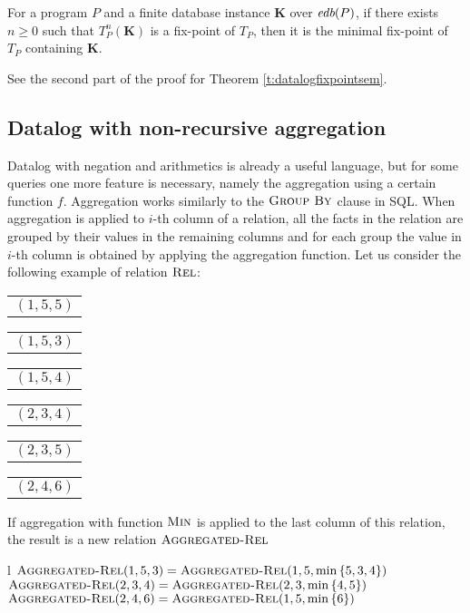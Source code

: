 \begin{thm}
For a program $P$ and a finite database instance $\textbf{K}$ over $\textit{edb}(P)$, if there exists $n \ge 0$ such that $T_P^n(\textbf{K})$ is a fix-point of $T_P$, then it is the minimal fix-point of $T_P$ containing $\textbf{K}$.
\end{thm}
\begin{prof}
See the second part of the proof for Theorem \ref{t:datalogfixpointsem}. \QEDA
\end{prof}


\subsection{Datalog with non-recursive aggregation}\label{ss:datalognra}

Datalog with negation and arithmetics is already a useful language, but for some queries one more feature is necessary, namely the  aggregation using a certain function $f$. Aggregation works similarly to the $\textsc{Group By}$ clause in SQL. When aggregation is applied to $i$-th column of a relation, all the facts in the relation are grouped by their values in the remaining columns and for each group the value in $i$-th column is obtained by applying the aggregation function.
Let us consider the following example of relation $\textsc{Rel}$:

\begin{center}
\begin{tabular}{l}
  $(1, 5, 5)$
\end{tabular}
\quad
\begin{tabular}{l}
  $(1, 5, 3)$
\end{tabular}
\quad
\begin{tabular}{l}
  $(1, 5, 4)$
\end{tabular}
\quad
\begin{tabular}{l}
  $(2, 3, 4)$
\end{tabular}
\quad
\begin{tabular}{l}
  $(2, 3, 5)$
\end{tabular}
\quad
\begin{tabular}{l}
  $(2, 4, 6)$
\end{tabular}
\end{center}


If aggregation with function $\textsc{Min}$ is applied to the last column of this relation, the result is a new relation $\textsc{Aggregated-Rel}$

\begin{centab}{ l }
  $\textsc{Aggregated-Rel}(1, 5, 3) = \textsc{Aggregated-Rel}(1, 5, \min{\{5, 3, 4\}})$ \\
  $\textsc{Aggregated-Rel}(2, 3, 4) = \textsc{Aggregated-Rel}(2, 3, \min{\{4, 5\}})$ \\
  $\textsc{Aggregated-Rel}(2, 4, 6) = \textsc{Aggregated-Rel}(1, 5, \min{\{6\}})$ \\
\end{centab}

